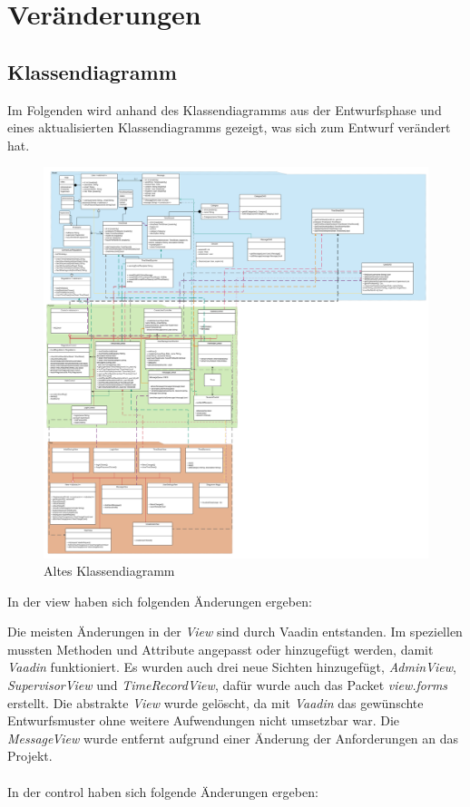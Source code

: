 \section{Veränderungen}
\subsection{Klassendiagramm}
Im Folgenden wird anhand des Klassendiagramms aus der Entwurfsphase und eines aktualisierten Klassendiagramms gezeigt, was sich zum Entwurf verändert hat.

\begin{figure}[H]
	\centering
	\includegraphics[scale=0.135]{Class-Diagramm_alt.pdf}
	\caption{Altes Klassendiagramm}
\end{figure}
\newpage

In der view haben sich folgenden Änderungen ergeben:

Die meisten Änderungen in der \emph{View} sind durch Vaadin entstanden. 
Im speziellen mussten Methoden und Attribute angepasst oder hinzugefügt werden, 
damit \emph{Vaadin} funktioniert.
Es wurden auch drei neue Sichten hinzugefügt, \emph{AdminView}, \emph{SupervisorView} und \emph{TimeRecordView}, 
dafür wurde auch das Packet \emph{view.forms} erstellt.
Die abstrakte \emph{View} wurde gelöscht, da mit \emph{Vaadin} das gewünschte Entwurfsmuster 
ohne weitere Aufwendungen nicht umsetzbar war.
Die \emph{MessageView} wurde entfernt aufgrund einer Änderung der Anforderungen an das Projekt.\\
\\
In der control haben sich folgende Änderungen ergeben:

